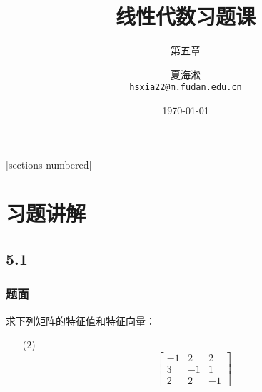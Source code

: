 \documentclass[9pt,xcolor=svgnames]{beamer} %
\title{线性代数习题课}
\author[夏海淞]{夏海淞\\ \texttt{hsxia22@m.fudan.edu.cn}}
\subtitle{第五章}
\institute[复旦大学]{计算机科学技术学院\\ 复旦大学}
\date{\today}
\begin{document}
{
\maketitle
}%


\begin{frame}
    [sections numbered] %
    \tableofcontents[hideallsubsections] %
\end{frame}

\section{习题讲解}

\subsection*{5.1}
\begin{frame}
    \frametitle{题面}
    求下列矩阵的特征值和特征向量：
    \begin{enumerate}
        \item[(2)]{
              \begin{equation*}
                  \begin{bmatrix}
                      -1 & 2  & 2  \\
                      3  & -1 & 1  \\
                      2  & 2  & -1
                  \end{bmatrix}
              \end{equation*}
              }
    \end{enumerate}
\end{frame}
\end{document}
